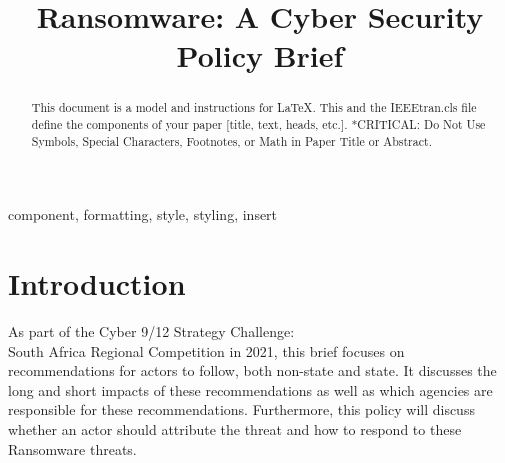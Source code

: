 \documentclass[conference]{IEEEtran}
\begin{document}
\title{Ransomware: A Cyber Security Policy Brief}

\author{
\and
{}
\and
{}
\and
{}
}

\maketitle

\begin{abstract}
This document is a model and instructions for \LaTeX.
This and the IEEEtran.cls file define the components of your paper [title, text, heads, etc.]. *CRITICAL: Do Not Use Symbols, Special Characters, Footnotes, 
or Math in Paper Title or Abstract.
\end{abstract}

\begin{IEEEkeywords}
component, formatting, style, styling, insert
\end{IEEEkeywords}

\section{Introduction}
As part of the Cyber 9/12 Strategy Challenge:\\
South Africa Regional Competition in 2021, this brief focuses on recommendations for actors to follow, both non-state and state. It discusses the long and short impacts of these recommendations as well as which agencies are responsible for these recommendations. Furthermore, this policy will discuss whether an actor should attribute the threat and how to respond to these Ransomware threats.
\end{document}

